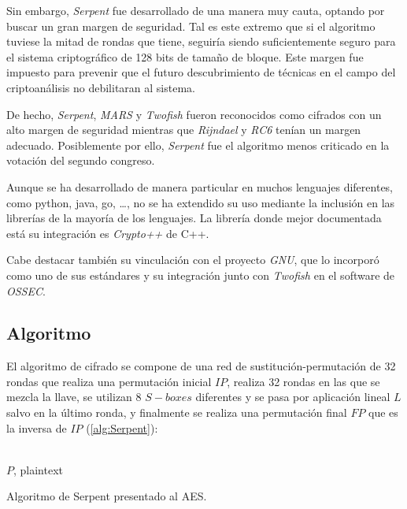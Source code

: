 Sin embargo, \textit{Serpent} fue desarrollado de una manera muy cauta, optando por buscar un gran margen de seguridad. Tal es este extremo que si el algoritmo tuviese la mitad de rondas que tiene, seguiría siendo suficientemente seguro para el sistema criptográfico de 128 bits de tamaño de bloque. Este margen fue impuesto para prevenir que el futuro descubrimiento de técnicas en el campo del criptoanálisis no debilitaran al sistema.

De hecho, \textit{Serpent}, \textit{MARS} y \textit{Twofish} fueron reconocidos como cifrados con un alto margen de seguridad mientras que \textit{Rijndael} y \textit{RC6} tenían un margen adecuado. Posiblemente por ello, \textit{Serpent} fue el algoritmo menos criticado en la votación del segundo congreso.\cite{AES_process}

Aunque se ha desarrollado de manera particular en muchos lenguajes diferentes, como python, java, go, \dots , no se ha extendido su uso mediante la inclusión en las librerías de la mayoría de los lenguajes. La librería donde mejor documentada está su integración es \textit{Crypto++}\cite{Crypto} de C++\cite{Implementations}.

Cabe destacar también su vinculación con el proyecto \textit{GNU}, que lo incorporó como uno de sus estándares y su integración junto con \textit{Twofish} en el software de \textit{OSSEC}.

\subsection{Algoritmo}
El algoritmo de cifrado se compone de una red de sustitución-permutación de 32 rondas que realiza una permutación inicial $IP$, realiza 32 rondas en las que se mezcla la llave, se utilizan 8 $S-boxes$ diferentes y se pasa por aplicación lineal $L$ salvo en la último ronda, y finalmente se realiza una permutación final $FP$ que es la inversa de $IP$ (\ref{alg:Serpent}):

\begin{algorithm}[H]
	\begin{algorithmic}[1]
		\REQUIRE \ \\
			\texttt{$P$}, plaintext\\
			
			\ELSE
			\ENDIF
		\ENDFOR
	\end{algorithmic}
	\caption{Algoritmo de Serpent presentado al AES.}
		\label{alg:Serpent}
\end{algorithm}

